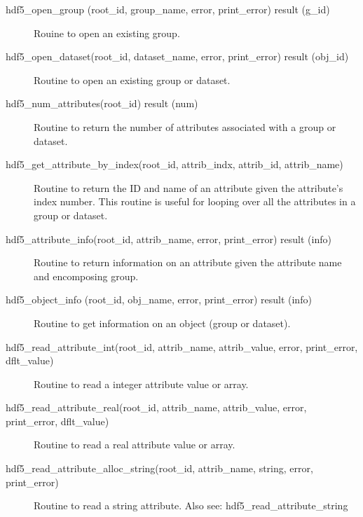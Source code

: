\begin{description}
\label{r:hdf5.open.group}
\item[hdf5_open_group (root_id, group_name, error, print_error) result (g_id)] \Newline 
Rouine to open an existing group.

\label{r:hdf5.open.dataset}
\item[hdf5_open_dataset(root_id, dataset_name, error, print_error) result (obj_id)] \Newline 
Routine to open an existing group or dataset.

\label{r:hdf5.num.attributes}
\item[hdf5_num_attributes(root_id) result (num)] \Newline 
Routine to return the number of attributes associated with a group or dataset.

\label{r:hdf5.get.attribute.by.index}
\item[hdf5_get_attribute_by_index(root_id, attrib_indx, attrib_id, attrib_name)] \Newline 
Routine to return the ID and name of an attribute given the attribute's index number.
This routine is useful for looping over all the attributes in a group or dataset.

\label{r:hdf5.attribute.info}
\item[hdf5_attribute_info(root_id, attrib_name, error, print_error) result (info)] \Newline 
Routine to return information on an attribute given the attribute name and encomposing group.

\label{r:hdf5.object.info}
\item[hdf5_object_info (root_id, obj_name, error, print_error) result (info)] \Newline 
Routine to get information on an object (group or dataset).

\label{r:hdf5.read.attribute.int}
\item[hdf5_read_attribute_int(root_id, attrib_name, attrib_value, error, print_error, dflt_value)] \Newline 
Routine to read a integer attribute value or array.

\label{r:hdf5.read.attribute.real}
\item[hdf5_read_attribute_real(root_id, attrib_name, attrib_value, error, print_error, dflt_value)] \Newline 
Routine to read a real attribute value or array.

\label{r:hdf5.read.attribute.alloc.string}
\item[hdf5_read_attribute_alloc_string(root_id, attrib_name, string, error, print_error)] \Newline 
Routine to read a string attribute.
Also see: hdf5_read_attribute_string


\end{description}
